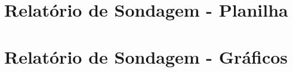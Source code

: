 \documentclass{report}
\begin{document}
    \section*{Relatório de Sondagem - Planilha}
    
    
    
    
    
    
    
    
    

    \section*{Relatório de Sondagem - Gráficos}
    
    
    
    
    
\end{document}
